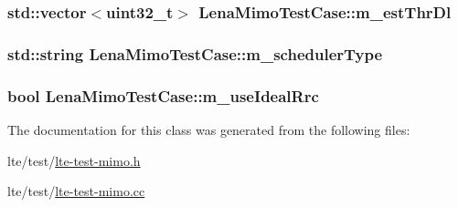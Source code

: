 \subsubsection[{\texorpdfstring{m\+\_\+est\+Thr\+Dl}{m_estThrDl}}]{\setlength{\rightskip}{0pt plus 5cm}std\+::vector$<$uint32\+\_\+t$>$ Lena\+Mimo\+Test\+Case\+::m\+\_\+est\+Thr\+Dl\hspace{0.3cm}{\ttfamily [private]}}\hypertarget{classLenaMimoTestCase_a9c7b83d2420ebbd235f35ad242602cb3}{}\label{classLenaMimoTestCase_a9c7b83d2420ebbd235f35ad242602cb3}
\subsubsection[{\texorpdfstring{m\+\_\+scheduler\+Type}{m_schedulerType}}]{\setlength{\rightskip}{0pt plus 5cm}std\+::string Lena\+Mimo\+Test\+Case\+::m\+\_\+scheduler\+Type\hspace{0.3cm}{\ttfamily [private]}}\hypertarget{classLenaMimoTestCase_a462839a0431fbfbc7650a5b1bfe1004c}{}\label{classLenaMimoTestCase_a462839a0431fbfbc7650a5b1bfe1004c}
\subsubsection[{\texorpdfstring{m\+\_\+use\+Ideal\+Rrc}{m_useIdealRrc}}]{\setlength{\rightskip}{0pt plus 5cm}bool Lena\+Mimo\+Test\+Case\+::m\+\_\+use\+Ideal\+Rrc\hspace{0.3cm}{\ttfamily [private]}}\hypertarget{classLenaMimoTestCase_a5bb5c39ff12567b31af7beab7c1caadb}{}\label{classLenaMimoTestCase_a5bb5c39ff12567b31af7beab7c1caadb}


The documentation for this class was generated from the following files\+:\begin{DoxyCompactItemize}
\item 
lte/test/\hyperlink{lte-test-mimo_8h}{lte-\/test-\/mimo.\+h}\item 
lte/test/\hyperlink{lte-test-mimo_8cc}{lte-\/test-\/mimo.\+cc}\end{DoxyCompactItemize}

